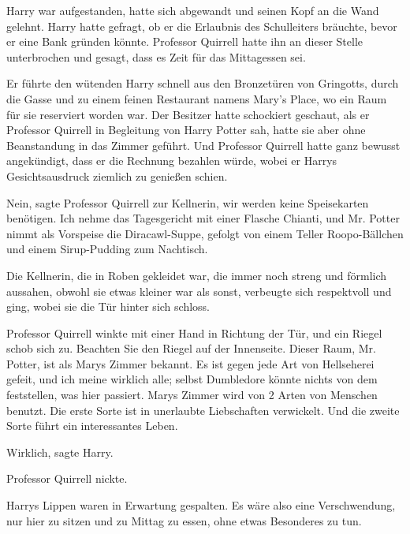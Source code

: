 Harry war aufgestanden, hatte sich abgewandt und seinen Kopf an die Wand
gelehnt. Harry hatte gefragt, ob er die Erlaubnis des Schulleiters bräuchte,
bevor er eine Bank gründen könnte. Professor Quirrell hatte ihn an dieser Stelle
unterbrochen und gesagt, dass es Zeit für das Mittagessen sei.

Er führte den wütenden Harry schnell aus den Bronzetüren von Gringotts, durch
die Gasse und zu einem feinen Restaurant namens Mary's Place, wo ein Raum für
sie reserviert worden war. Der Besitzer hatte schockiert geschaut, als er
Professor Quirrell in Begleitung von Harry Potter sah, hatte sie aber ohne
Beanstandung in das Zimmer geführt. Und Professor Quirrell hatte ganz bewusst
angekündigt, dass er die Rechnung bezahlen würde, wobei er Harrys
Gesichtsausdruck ziemlich zu genießen schien.

\glqq Nein\grqq{}, sagte Professor Quirrell zur Kellnerin, \glqq wir werden
keine Speisekarten benötigen. Ich nehme das Tagesgericht mit einer Flasche
Chianti, und Mr. Potter nimmt als Vorspeise die Diracawl-Suppe, gefolgt von
einem Teller Roopo-Bällchen und einem Sirup-Pudding zum Nachtisch.\grqq{}

Die Kellnerin, die in Roben gekleidet war, die immer noch streng und förmlich
aussahen, obwohl sie etwas kleiner war als sonst, verbeugte sich respektvoll und
ging, wobei sie die Tür hinter sich schloss.

Professor Quirrell winkte mit einer Hand in Richtung der Tür, und ein Riegel
schob sich zu. \glqq Beachten Sie den Riegel auf der Innenseite. Dieser Raum,
Mr. Potter, ist als Marys Zimmer bekannt. Es ist gegen jede Art von Hellseherei
gefeit, und ich meine wirklich alle; selbst Dumbledore könnte nichts von dem
feststellen, was hier passiert. Marys Zimmer wird von 2 Arten von Menschen
benutzt. Die erste Sorte ist in unerlaubte Liebschaften verwickelt. Und die
zweite Sorte führt ein interessantes Leben.\grqq{}

\glqq Wirklich\grqq{}, sagte Harry.

Professor Quirrell nickte.

Harrys Lippen waren in Erwartung gespalten. \glqq Es wäre also eine
Verschwendung, nur hier zu sitzen und zu Mittag zu essen, ohne etwas Besonderes
zu tun.\grqq{}

